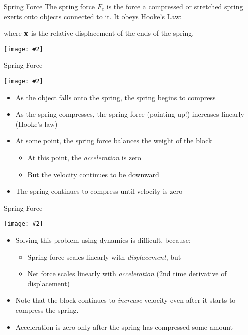 \documentclass[12pt,compress,aspectratio=169]{beamer}
\newcommand{\pic}[2]{\texttt{[image: \#2]}}
\newcommand{\mb}[1]{\ensuremath\mathbf{#1}}
\newcommand{\eq}[2]{\vspace{#1}{\Large\begin{displaymath}#2\end{displaymath}}}
\begin{document}
\begin{frame}{Spring Force}
  The spring force $F_e$ is the force a compressed or stretched spring
  exerts onto objects connected to it. It obeys Hooke's Law:
  
  \eq{-.2in}{
    \mb{F}_e=-k\mb{x}
  }
  where $\mb{x}$ is the relative displacement of the ends of the spring.
  \begin{center}
    \pic{.35}{graphics/spring-example1.png}
  \end{center}
\end{frame}


\begin{frame}{Spring Force}
  \begin{center}
    \pic{.28}{graphics/spring-example1.png}
  \end{center}
  \begin{itemize}
  \item\vspace{-.15in}As the object falls onto the spring, the spring begins to
    compress
  \item As the spring compresses, the spring force (pointing up!) increases
    linearly (Hooke's law)
  \item At some point, the spring force balances the weight of the block
    \begin{itemize}
    \item At this point, the \emph{acceleration} is zero
    \item But the velocity continues to be downward
    \end{itemize}
  \item The spring continues to compress until velocity is zero
  \end{itemize}
\end{frame}



\begin{frame}{Spring Force}
  \begin{center}
    \pic{.28}{graphics/spring-example1.png}
  \end{center}
  \begin{itemize}
  \item\vspace{-.15in}Solving this problem using dynamics is difficult, because:
    \begin{itemize}
    \item Spring force scales linearly with \emph{displacement}, but
    \item Net force scales linearly with \emph{acceleration} (2nd time
      derivative of displacement)
    \end{itemize}
  \item Note that the block continues to \emph{increase} velocity even after
    it starts to compress the spring.
  \item Acceleration is zero only after the spring has compressed some amount
  \end{itemize}
\end{frame}
\end{document}
